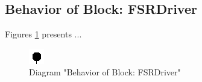 \subsection{Behavior of Block: FSRDriver}
Figures \ref{fig:FSRDriverFSRDriver22} presents ...
\begin{figure}[htb]
\centering
\includegraphics[width=\textwidth]{img_2_2.png}
\caption{Diagram "Behavior of Block: FSRDriver"}
\label{fig:FSRDriverFSRDriver22}
\end{figure}

